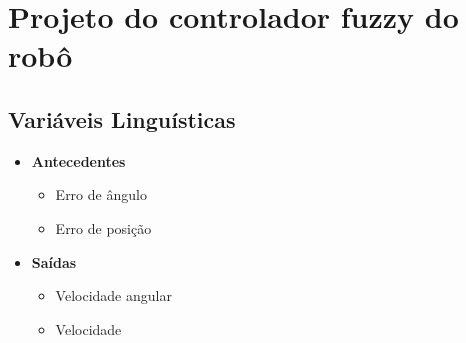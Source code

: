 \section{Projeto do controlador fuzzy do robô}
    \subsection{Variáveis Linguísticas}
        \begin{itemize}
            \item{\bf{Antecedentes}}
                \begin{itemize}
                    \item Erro de ângulo
                    \item Erro de posição
                \end{itemize}
            \item{\bf{Saídas}}
                \begin{itemize}
                        \item Velocidade angular
                        \item Velocidade
                \end{itemize}
        \end{itemize}

